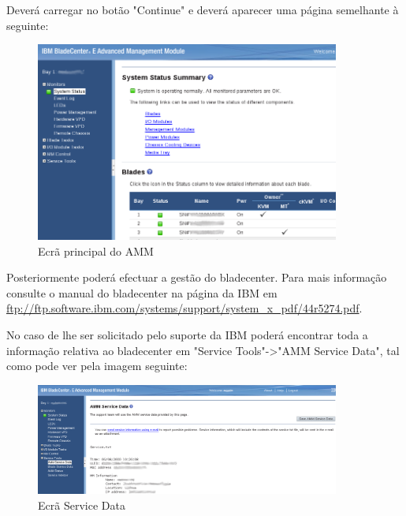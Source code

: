 Deverá carregar no botão "Continue" e deverá aparecer uma página semelhante à seguinte:

\begin{figure}[H]
    \begin{center}
        \includegraphics[width=10cm]{include/img/amm_bladecenterE_3}
    \end{center}
    \caption{Ecrã principal do AMM}
    \label{fig:amm-3}
\end{figure}


Posteriormente poderá efectuar a gestão do bladecenter. Para mais informação consulte o manual do bladecenter na página da IBM em \url{ftp://ftp.software.ibm.com/systems/support/system\_x\_pdf/44r5274.pdf}.

No caso de lhe ser solicitado pelo suporte da IBM poderá encontrar toda a informação relativa ao bladecenter em "Service Tools"->"AMM Service Data", tal como pode ver pela imagem seguinte:

\begin{figure}[H]
    \begin{center}
        \includegraphics[width=10cm]{include/img/amm_bladecenterE_4}
    \end{center}
    \caption{Ecrã Service Data}
    \label{fig:amm-4}
\end{figure}


